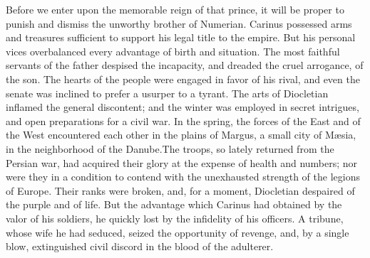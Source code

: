 



Before we enter upon the memorable reign of that prince, it will
be proper to punish and dismiss the unworthy brother of Numerian.
Carinus possessed arms and treasures sufficient to support his
legal title to the empire. But his personal vices overbalanced
every advantage of birth and situation. The most faithful
servants of the father despised the incapacity, and dreaded the
cruel arrogance, of the son. The hearts of the people were
engaged in favor of his rival, and even the senate was inclined
to prefer a usurper to a tyrant. The arts of Diocletian inflamed
the general discontent; and the winter was employed in secret
intrigues, and open preparations for a civil war. In the spring,
the forces of the East and of the West encountered each other in
the plains of Margus, a small city of Mæsia, in the neighborhood
of the Danube.\footnotemark[108] The troops, so lately returned from the
Persian war, had acquired their glory at the expense of health
and numbers; nor were they in a condition to contend with the
unexhausted strength of the legions of Europe. Their ranks were
broken, and, for a moment, Diocletian despaired of the purple and
of life. But the advantage which Carinus had obtained by the
valor of his soldiers, he quickly lost by the infidelity of his
officers. A tribune, whose wife he had seduced, seized the
opportunity of revenge, and, by a single blow, extinguished civil
discord in the blood of the adulterer.\footnotemark[109]



